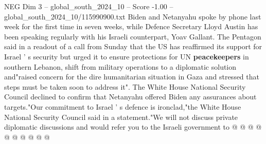 \begin{textsample}{NEG Dim 3 – global\_south\_2024\_10 – Score -1.00 – global\_south\_2024\_10/115990900.txt}
Biden and Netanyahu spoke by phone last week for the first time in seven weeks, while Defence Secretary Lloyd Austin has been speaking regularly with his Israeli counterpart, Yoav Gallant.
The Pentagon said in a readout of a call from Sunday that the US has reaffirmed its support for Israel ' s security but urged it to ensure protections for UN \textbf{peacekeepers} in southern Lebanon, shift from military operations to a diplomatic solution and"raised concern for the dire humanitarian situation in Gaza and stressed that steps must be taken soon to address it".
The White House National Security Council declined to confirm that Netanyahu offered Biden any assurances about targets."Our commitment to Israel ' s defence is ironclad,"the White House National Security Council said in a statement."We will not discuss private diplomatic discussions and would refer you to the Israeli government to @ @ @ @ @ @ @ @ @ @

\end{textsample}
